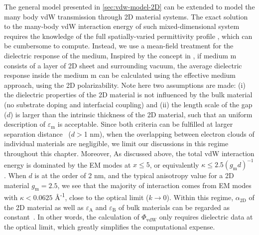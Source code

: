 The general model presented in \autoref{sec:vdw-model-2D} can be
extended to model the many body vdW transmission through 2D material
systems.
%
The exact solution to the many-body vdW interaction energy of such
mixed-dimensional system requires the knowledge of the full
spatially-varied permittivity profile \cite{Podgornik_2004_continuum},
which can be cumbersome to compute.
%
Instead, we use a mean-field treatment for
the dielectric response of the medium, Inspired by the concept in
, if medium m consists of a layer of
2D sheet and surrounding vacuum, the average dielectric response
inside the medium m can be calculated using the effective medium
approach, using the 2D polarizability. 
%
Note here two assumptions are made: (i) the dielectric properties of
the 2D material is not influenced by the bulk material (\ie no
substrate doping and interfacial coupling) and (ii) the length scale
of the gap ($d$) is larger than the intrinsic thickness of the 2D
material, such that an uniform description of $\varepsilon_{\mathrm{m}}$ is acceptable.
%
Since both criteria can be fulfilled at larger separation
distance~\cite{Dobson_2012_rev} (\eg $d>$1 nm), when the overlapping
between electron clouds of individual materials are negligible, we
limit our discussions in this regime throughout this chapter.
%
Moreover, As discussed above, the total vdW interaction energy is dominated by
the EM modes at $x \leq 5$, or equivalently
\(\kappa \leq 2.5 (g_{\mathrm{m}} d)^{-1}\).
%
When $d$ is at the order of 2 nm, and the typical anisotropy value for
a 2D material $g_{\mathrm{m}}=2.5$, we see that the majority of interaction comes
from EM modes with \(\kappa<0.0625\) \AA{}\textsuperscript{-1}, close to the optical limit ($k\to0$).
%
Within this regime, $\alpha_{\mathrm{2D}}$ of the 2D material as well
as $\varepsilon_{\mathrm{A}}$ and $\varepsilon_{\mathrm{B}}$ of bulk
materials can be regarded as
constant~\cite{Li_2005_diele}.
%
In other words, the calculation of $\Phi_{\mathrm{vdW}}$ only requires
dielectric data at the optical limit, which greatly simplifies the
computational expense.

